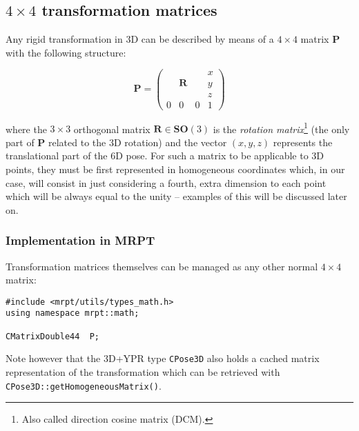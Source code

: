\documentclass[a4paper,11pt]{report}
\begin{document}
%

\subsection{$4 \times 4$ transformation matrices}

Any rigid transformation in 3D can be described by means of a $4 \times 4$
matrix $\mathbf{P}$ with the following structure:

\begin{equation}
\mathbf{P}=\left(
  \begin{array}{ccc|c}
   & & & x \\
   & \mathbf{R} & & y \\
   & & & z \\ \hline
   0 & 0 & 0& 1
  \end{array}
\right)
\end{equation}

\noindent where the $3 \times 3$ orthogonal matrix $\mathbf{R} \in \mathbf{SO}(3)$
is the \emph{rotation matrix}\footnote{Also called direction cosine matrix (DCM).}
(the only part of $\mathbf{P}$ related to
the 3D rotation) and the vector $(x,y,z)$ represents the translational part of the 6D pose.
For such a matrix to be applicable to 3D points, they must be first represented in
homogeneous coordinates \cite{bloomenthal1994homogeneous} which, in our case, will consist in just considering a fourth,
extra dimension to each point which will be always equal to the unity -- examples of this will be discussed later on.


\subsubsection{Implementation in MRPT}

Transformation matrices themselves can be managed as any other normal $4\times 4$ matrix:

\begin{lstlisting}
#include <mrpt/utils/types_math.h>
using namespace mrpt::math;

CMatrixDouble44  P;
\end{lstlisting}

Note however that the 3D+YPR type \texttt{CPose3D} also holds a cached matrix representation
of the transformation which can be retrieved with \texttt{CPose3D::getHomogeneousMatrix()}.



\end{document}
